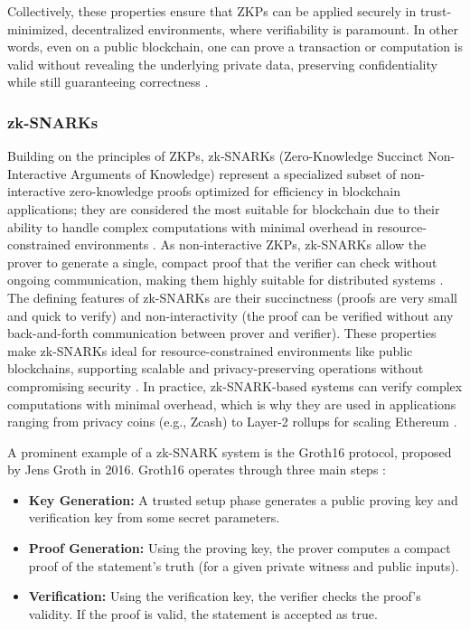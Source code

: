 \vspace{12pt}

Collectively, these properties ensure that ZKPs can be applied securely in trust-minimized, decentralized environments, where verifiability is paramount. In other words, even on a public blockchain, one can prove a transaction or computation is valid without revealing the underlying private data, preserving confidentiality while still guaranteeing correctness \cite{Cha24,DWF25}.

\vspace{12pt}
\subsubsection{zk-SNARKs}
\vspace{12pt}

Building on the principles of ZKPs, zk-SNARKs (Zero-Knowledge Succinct Non-Interactive Arguments of Knowledge) represent a specialized subset of non-interactive zero-knowledge proofs optimized for efficiency in blockchain applications; they are considered the most suitable for blockchain due to their ability to handle complex computations with minimal overhead in resource-constrained environments \cite{Gro16,Sta24}. As non-interactive ZKPs, zk-SNARKs allow the prover to generate a single, compact proof that the verifier can check without ongoing communication, making them highly suitable for distributed systems \cite{FS86}. The defining features of zk-SNARKs are their succinctness (proofs are very small and quick to verify) and non-interactivity (the proof can be verified without any back-and-forth communication between prover and verifier). These properties make zk-SNARKs ideal for resource-constrained environments like public blockchains, supporting scalable and privacy-preserving operations without compromising security \cite{Cha24,Gro16}. In practice, zk-SNARK-based systems can verify complex computations with minimal overhead, which is why they are used in applications ranging from privacy coins (e.g., Zcash) to Layer-2 rollups for scaling Ethereum \cite{Cyr24}.

\vspace{12pt}

A prominent example of a zk-SNARK system is the Groth16 protocol, proposed by Jens Groth in 2016. Groth16 operates through three main steps \cite{Gro16,Lav23}:

\vspace{12pt}

\begin{itemize}
    \item \textbf{Key Generation:} A trusted setup phase generates a public proving key and verification key from some secret parameters.
    \item \textbf{Proof Generation:} Using the proving key, the prover computes a compact proof of the statement’s truth (for a given private witness and public inputs).
    \item \textbf{Verification:} Using the verification key, the verifier checks the proof’s validity. If the proof is valid, the statement is accepted as true.
\end{itemize}

